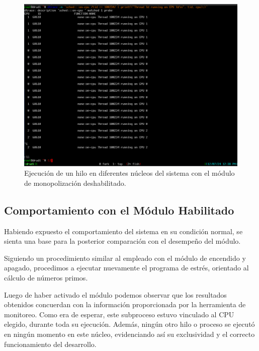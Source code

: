 \begin{figure}[H]
    \centering
    \includegraphics[width=1\textwidth]{images/dtrace_disabled.png}
    \caption{Ejecución de un hilo en diferentes núcleos del sistema con el módulo de monopolización deshabilitado.}
    \label{fig:dtrace_disabled}
\end{figure}


\subsection{Comportamiento con el Módulo Habilitado}
Habiendo expuesto el comportamiento del sistema en su condición normal, se sienta una base para la posterior comparación con el desempeño del módulo.\par

Siguiendo un procedimiento similar al empleado con el módulo de encendido y apagado, procedimos a ejecutar nuevamente el programa de estrés, orientado al cálculo de números primos.\par

Luego de haber activado el módulo podemos observar que los resultados obtenidos concuerdan con la información proporcionada por la  herramienta de monitoreo. Como era de esperar, este subproceso estuvo vinculado al CPU elegido, durante toda su ejecución. Además, ningún otro hilo o proceso se ejecutó en ningún momento en este núcleo, evidenciando así su exclusividad y el correcto funcionamiento del desarrollo.\par

